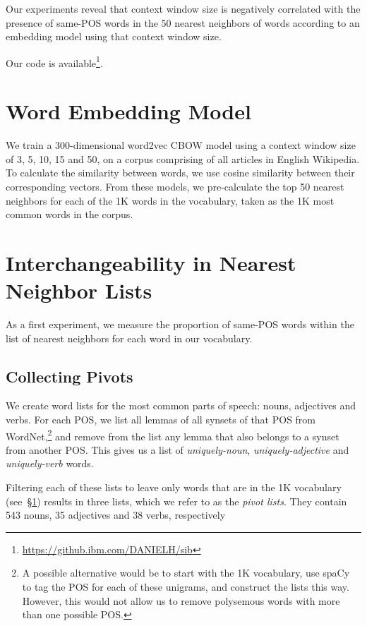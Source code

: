 \documentclass[11pt,a4paper]{article}
\begin{document}
    Our experiments reveal that context window size is negatively correlated
    with the presence of same-POS words in the 50 nearest neighbors of words
    according to an embedding model using that context window size.
    
    Our code is available\footnote{\url{https://github.ibm.com/DANIELH/sib}}.
    
    \section{Word Embedding Model}\label{sec:model}
    
    We train a 300-dimensional word2vec CBOW model using a context window size of
    3, 5, 10, 15 and 50, on a corpus comprising of all articles in English Wikipedia.
    To calculate the similarity between words, we use cosine similarity
    between their corresponding vectors.
    From these models, we pre-calculate the top 50 nearest neighbors for
    each of the 1K words in the vocabulary, taken as the 1K most common
    words in the corpus.
    
    
    \section{Interchangeability in Nearest Neighbor Lists}\label{sec:nn}
    
    As a first experiment, we measure the proportion of same-POS words
    within the list of nearest neighbors for each word in our vocabulary.
    
    \subsection{Collecting Pivots}\label{sec:pivots}
    
    We create word lists for the most
    common parts of speech: nouns, adjectives and verbs.
    For each POS, we list all lemmas of all synsets of that POS from
    WordNet,\footnote{A possible alternative would be to start with the 1K
    vocabulary, use spaCy to tag the POS for each of these unigrams,
    and construct the lists this way.
    However, this would not allow us to remove polysemous words with more
    than one possible POS.}
    and remove from the list any lemma that also belongs to a synset from
    another POS.
    This gives us a list of \textit{uniquely-noun}, \textit{uniquely-adjective}
    and \textit{uniquely-verb} words.
    
    Filtering each of these lists to leave only words that are in
    the 1K vocabulary (see~\S\ref{sec:model}) results in three lists,
    which we refer to as the \textit{pivot lists}.
    They contain 543 nouns, 35 adjectives and 38 verbs, respectively
    
\end{document}
